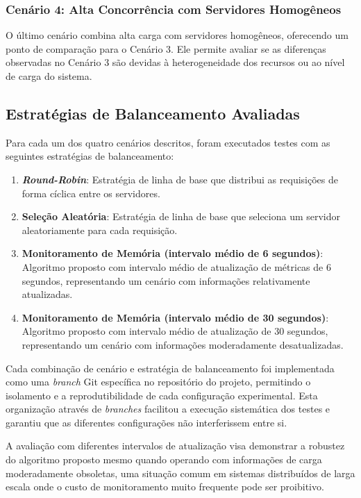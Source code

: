 \subsubsection{Cenário 4: Alta Concorrência com Servidores Homogêneos}

O último cenário combina alta carga com servidores homogêneos, oferecendo um ponto de comparação para o Cenário 3. Ele permite avaliar se as diferenças observadas no Cenário 3 são devidas à heterogeneidade dos recursos ou ao nível de carga do sistema.

\subsection{Estratégias de Balanceamento Avaliadas}

Para cada um dos quatro cenários descritos, foram executados testes com as seguintes estratégias de balanceamento:

\begin{enumerate}
    \item \textbf{\textit{Round-Robin}}: Estratégia de linha de base que distribui as requisições de forma cíclica entre os servidores.
    
    \item \textbf{Seleção Aleatória}: Estratégia de linha de base que seleciona um servidor aleatoriamente para cada requisição.
    
    \item \textbf{Monitoramento de Memória (intervalo médio de 6 segundos)}: Algoritmo proposto com intervalo médio de atualização de métricas de 6 segundos, representando um cenário com informações relativamente atualizadas.
    
    \item \textbf{Monitoramento de Memória (intervalo médio de 30 segundos)}: Algoritmo proposto com intervalo médio de atualização de 30 segundos, representando um cenário com informações moderadamente desatualizadas.
\end{enumerate}

Cada combinação de cenário e estratégia de balanceamento foi implementada como uma \textit{branch} Git específica no repositório do projeto, permitindo o isolamento e a reprodutibilidade de cada configuração experimental. Esta organização através de \textit{branches} facilitou a execução sistemática dos testes e garantiu que as diferentes configurações não interferissem entre si.

A avaliação com diferentes intervalos de atualização visa demonstrar a robustez do algoritmo proposto mesmo quando operando com informações de carga moderadamente obsoletas, uma situação comum em sistemas distribuídos de larga escala onde o custo de monitoramento muito frequente pode ser proibitivo.

